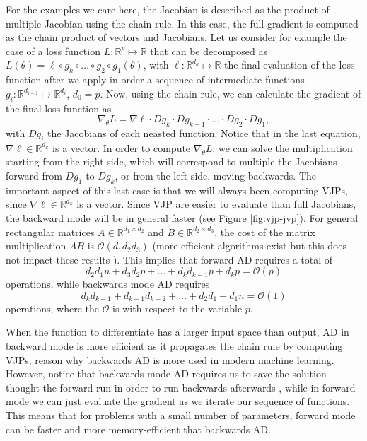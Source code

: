 For the examples we care here, the Jacobian is described as the product of multiple Jacobian using the chain rule.
In this case, the full gradient is computed as the chain product of vectors and Jacobians. 
Let us consider for example the case of a loss function $L : \mathbb R^p \mapsto \mathbb R$ that can be decomposed as $L(\theta) = \ell \circ g_{k} \circ \ldots \circ g_2 \circ g_1(\theta)$, with $\ell : \mathbb R^{d_k} \mapsto \mathbb R$ the final evaluation of the loss function after we apply in order a sequence of intermediate functions $g_i : \mathbb R^{d_{i-1}} \mapsto \mathbb R^{d_i}$, $d_0 = p$. 
Now, using the chain rule, we can calculate the gradient of the final loss function as
\begin{equation}
 \nabla_\theta L = \nabla \ell \cdot Dg_{k} \cdot Dg_{k-1} \cdot \ldots \cdot Dg_2 \cdot Dg_1, 
\end{equation}
with $Dg_i$ the Jacobians of each neasted function. 
Notice that in the last equation, $\nabla \ell \in \mathbb R^{d_k}$ is a vector.
In order to compute $\nabla_\theta L$, we can solve the multiplication starting from the right side, which will correspond to multiple the Jacobians forward from $Dg_1$ to $Dg_k$, or from the left side, moving backwards. 
The important aspect of this last case is that we will always been computing VJPs, since $\nabla \ell \in \mathbb R^{d_k}$ is a vector.
Since VJP are easier to evaluate than full Jacobians, the backward mode will be in general faster (see Figure \ref{fig:vjp-jvp}). 
For general rectangular matrices $A\in \mathbb R^{d_1 \times d_2}$ and $B \in \mathbb R^{d_2 \times d_3}$, the cost of the matrix multiplication $AB$ is $\mathcal O (d_1 d_2 d_3)$ (more efficient algorithms exist but this does not impact these results ). This implies that forward AD requires a total of
\begin{equation}
 d_2 d_1 n + d_3 d_2 p + \ldots + d_k d_{k-1} p + d_k p = \mathcal O (p)
\end{equation}
operations, while backwards mode AD requires
\begin{equation}
 d_k d_{k-1} + d_{k-1} d_{k-2} + \ldots + d_2 d_1 + d_1 n = \mathcal O (1)
\end{equation}
operations, where the $\mathcal O$ is with respect to the variable $p$. 

When the function to differentiate has a larger input space than output, AD in backward mode is more efficient as it propagates the chain rule by computing VJPs, reason why backwards AD is more used in modern machine learning.
However, notice that backwards mode AD requires us to save the solution thought the forward run in order to run backwards afterwards \cite{Bennett_1973}, while in forward mode we can just evaluate the gradient as we iterate our sequence of functions. 
This means that for problems with a small number of parameters, forward mode can be faster and more memory-efficient that backwards AD.

